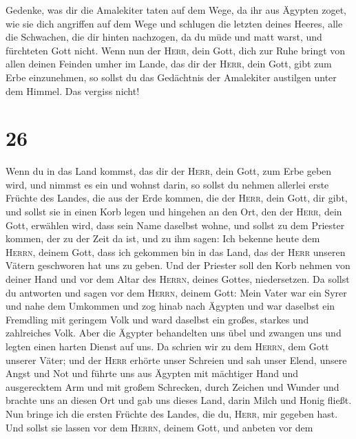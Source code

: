  Gedenke, was dir die Amalekiter taten auf dem Wege, da
ihr aus Ägypten zoget,  wie sie dich angriffen auf dem
Wege und schlugen die letzten deines Heeres, alle die Schwachen, die dir
hinten nachzogen, da du müde und matt warst, und fürchteten Gott nicht.
 Wenn nun der \textsc{Herr}, dein Gott, dich zur Ruhe
bringt von allen deinen Feinden umher im Lande, das dir der
\textsc{Herr}, dein Gott, gibt zum Erbe einzunehmen, so sollst du das
Gedächtnis der Amalekiter austilgen unter dem Himmel. Das vergiss nicht!

\hypertarget{section-25}{%
\section{26}\label{section-25}}

 Wenn du in das Land kommst, das dir der \textsc{Herr},
dein Gott, zum Erbe geben wird, und nimmst es ein und wohnst darin,
 so sollst du nehmen allerlei erste Früchte des Landes,
die aus der Erde kommen, die der \textsc{Herr}, dein Gott, dir gibt, und
sollst sie in einen Korb legen und hingehen an den Ort, den der
\textsc{Herr}, dein Gott, erwählen wird, dass sein Name daselbst wohne,
 und sollst zu dem Priester kommen, der zu der Zeit da
ist, und zu ihm sagen: Ich bekenne heute dem \textsc{Herrn}, deinem
Gott, dass ich gekommen bin in das Land, das der \textsc{Herr} unseren
Vätern geschworen hat uns zu geben.  Und der Priester soll
den Korb nehmen von deiner Hand und vor dem Altar des \textsc{Herrn},
deines Gottes, niedersetzen.  Da sollst du antworten und
sagen vor dem \textsc{Herrn}, deinem Gott: Mein Vater war ein Syrer und
nahe dem Umkommen und zog hinab nach Ägypten und war daselbst ein
Fremdling mit geringem Volk und ward daselbst ein großes, starkes und
zahlreiches Volk.  Aber die Ägypter behandelten uns übel
und zwangen uns und legten einen harten Dienst auf uns. 
Da schrien wir zu dem \textsc{Herrn}, dem Gott unserer Väter; und der
\textsc{Herr} erhörte unser Schreien und sah unser Elend, unsere Angst
und Not  und führte uns aus Ägypten mit mächtiger Hand und
ausgerecktem Arm und mit großem Schrecken, durch Zeichen und Wunder
 und brachte uns an diesen Ort und gab uns dieses Land,
darin Milch und Honig fließt.  Nun bringe ich die ersten
Früchte des Landes, die du, \textsc{Herr}, mir gegeben hast. Und sollst
sie lassen vor dem \textsc{Herrn}, deinem Gott, und anbeten vor dem

